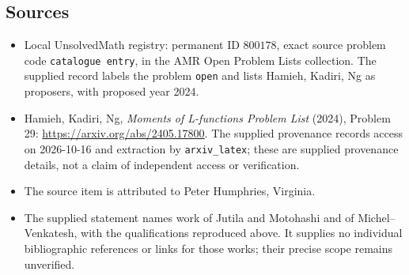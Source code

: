 \documentclass[11pt]{article}
\begin{document}
\subsection{Sources}
\begin{itemize}
\item Local UnsolvedMath registry: permanent ID \(800178\), exact source problem code \texttt{catalogue entry}, in the AMR Open Problem Lists collection. The supplied record labels the problem \texttt{open} and lists Hamieh, Kadiri, Ng as proposers, with proposed year 2024.
\item Hamieh, Kadiri, Ng, \emph{Moments of L-functions Problem List} (2024), Problem 29: \url{https://arxiv.org/abs/2405.17800}. The supplied provenance records access on 2026-10-16 and extraction by \texttt{arxiv\_latex}; these are supplied provenance details, not a claim of independent access or verification.
\item The source item is attributed to Peter Humphries, Virginia.
\item The supplied statement names work of Jutila and Motohashi and of Michel--Venkatesh, with the qualifications reproduced above. It supplies no individual bibliographic references or links for those works; their precise scope remains unverified.
\end{itemize}
\end{document}

